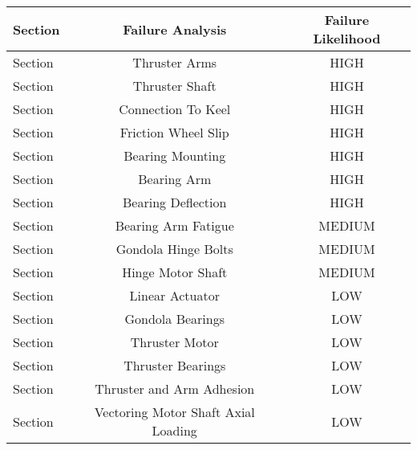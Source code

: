 \documentclass[../main.tex]{subfiles}
\begin{document}
\begin{center}
	\begin{tabular}{|l|c|c|}
	\hline
	\textbf{Section} &\textbf{Failure Analysis} & \textbf{Failure Likelihood} \\
	\hline
	Section & Thruster Arms & \cellcolor{black}\color{white}HIGH \\
	\hline
	Section & Thruster Shaft & \cellcolor{black}\color{white}HIGH \\
	\hline
	Section & Connection To Keel & \cellcolor{black}\color{white}HIGH \\
	\hline
	Section & Friction Wheel Slip & \cellcolor{black}\color{white}HIGH \\
	\hline
	Section & Bearing Mounting & \cellcolor{black}\color{white}HIGH \\
	\hline
	Section & Bearing Arm & \cellcolor{black}\color{white}HIGH \\
	\hline
	Section & Bearing Deflection & \cellcolor{black}\color{white}HIGH \\
	\hline
	Section & Bearing Arm Fatigue & \cellcolor{gray}MEDIUM \\
	\hline
	Section & Gondola Hinge Bolts & \cellcolor{gray}MEDIUM \\
	\hline
	Section & Hinge Motor Shaft & \cellcolor{gray}MEDIUM \\
	\hline
	Section & Linear Actuator & LOW \\
	\hline
	Section & Gondola Bearings & LOW \\
	\hline
	Section & Thruster Motor & LOW \\
	\hline
	Section & Thruster Bearings & LOW \\
	\hline
	Section & Thruster and Arm Adhesion & LOW \\
	\hline
	Section & Vectoring Motor Shaft Axial Loading & LOW \\
	\hline
	\end{tabular}
\end{center}
\end{document}
